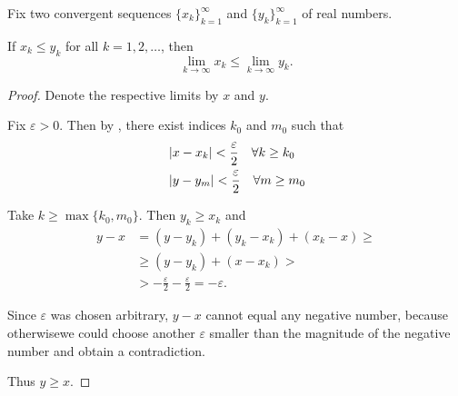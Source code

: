 \begin{Proposition}\label{thm:one_sided_squeeze_lemma}
  Fix two convergent sequences \( \{ x_k \}_{k=1}^\infty \) and \( \{ y_k \}_{k=1}^\infty \) of real numbers.

  If \( x_k \leq y_k \) for all \( k = 1, 2, \ldots \), then
  \begin{equation*}
    \lim_{k \to \infty} x_k \leq \lim_{k \to \infty} y_k.
  \end{equation*}
\end{Proposition}
\begin{proof}
  Denote the respective limits by \( x \) and \( y \).

  Fix \( \varepsilon > 0 \). Then by , there exist indices \( k_0 \) and \( m_0 \) such that
  \begin{align*}
    &\left\vert x - x_k \right\vert < \frac \varepsilon 2 \quad\forall k \geq k_0 \\
    &\left\vert y - y_m \right\vert < \frac \varepsilon 2 \quad\forall m \geq m_0
  \end{align*}

  Take \( k \geq \max \{ k_0, m_0 \} \). Then \( y_k \geq x_k \) and
  \begin{align*}
    y - x
    &=
    (y - y_k) + (y_k - x_k) + (x_k - x)
    \geq \\ &\geq
    (y - y_k) + (x - x_k)
    > \\ &>
    - \frac \varepsilon 2 - \frac \varepsilon 2
    =
    - \varepsilon.
  \end{align*}

  Since \( \varepsilon \) was chosen arbitrary, \( y - x \) cannot equal any negative number, because otherwise\LEM we could choose another \( \varepsilon \) smaller than the magnitude of the negative number and obtain a contradiction.

  Thus \( y \geq x \).
\end{proof}

